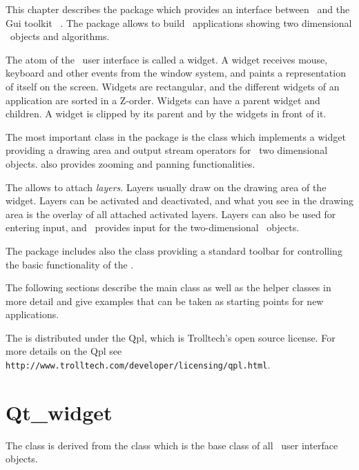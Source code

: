 This chapter describes the  package which provides
an interface between \cgal\  and the  {\sc Gui} toolkit \qt\ .
The  package allows to build \qt\ 
applications  showing two dimensional \cgal\ objects 
and algorithms.


The atom of the \qt\ user interface is called a widget.
A widget receives mouse, keyboard and other 
events from the window system, and paints a representation of itself on the 
screen. Widgets are rectangular, and the different widgets
of an application  are sorted in a Z-order. Widgets
can have a parent widget and  children.
A widget is clipped by its parent and by the widgets in front of it. 


The most important class in the package
is the class  which implements a widget
providing 
a drawing area and output stream operators for \cgal\ 
two dimensional objects.   also provides
zooming and panning functionalities.

The \ccStyle{Qt_widget} allows to attach {\em layers}. Layers usually
draw on the drawing area of the widget. Layers can be activated and
deactivated, and what you see in the drawing area is the overlay of
all attached activated layers. Layers can also be used for entering
input, and \cgal\ provides input \ccc{layers} for the two-dimensional
\cgal\ objects.

The package includes also the class 
 providing a  standard toolbar for controlling the basic functionality
of the \ccStyle{Qt_widget}.

The following sections describe the main class as well as the helper classes
in more detail and give examples that can be taken as starting points for
new applications.


 The  is distributed under
the {\sc Qpl}, which is Trolltech's open source license. For more details
on the {\sc Qpl} see \verb+http://www.trolltech.com/developer/licensing/qpl.html+.

\section{Qt\_widget}
\label{Qt_widget}

The class  is derived from the class 
which is the base class of all \qt\ user interface objects. 


